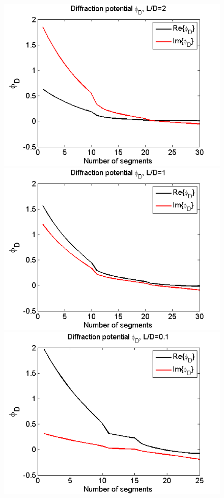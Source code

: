 \documentclass[a4paper,10pt]{article}
\begin{document}
\begin{figure}[H]
  \includegraphics[width=\linewidth]{diff_box1.png}
  \caption{}\label{diff_box1}
\endminipage
{}
  \includegraphics[width=\linewidth]{diff_box2.png}
  \caption{}\label{diff_box2}
\endminipage
{}%
  \includegraphics[width=\linewidth]{diff_box3.png}
  \caption{}\label{diff_box3}
\endminipage
\end{figure}
\end{document}
